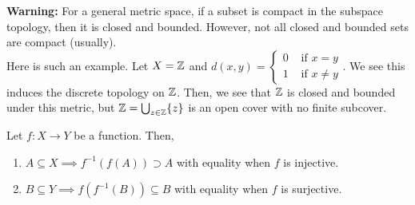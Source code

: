 \textbf{Warning:} For a general metric space, if a subset is compact in the subspace topology, then it is closed and bounded. However, not all closed and bounded sets are compact (usually).\\

Here is such an example. Let $X = \mathbb{Z}$ and $d(x, y) = \left\{\begin{matrix} 0 & \text{ if } x = y \\ 1 & \text{ if } x \ne y\end{matrix}\right.$. We see this induces the discrete topology on $\mathbb{Z}$. Then, we see that $\mathbb{Z}$ is closed and bounded under this metric, but $\mathbb{Z} = \bigcup_{z \in \mathbb{Z}}\{z\}$ is an open cover with no finite subcover.\\

\begin{lemma}
    Let $f : X \to Y$ be a function. Then,
    \begin{enumerate}
        \item $A \subseteq X \implies f^{-1}(f(A)) \supset A$ with equality when $f$ is injective.
        \item $B \subseteq Y \implies f(f^{-1}(B)) \subseteq B$ with equality when $f$ is surjective.
    \end{enumerate}
\end{lemma}